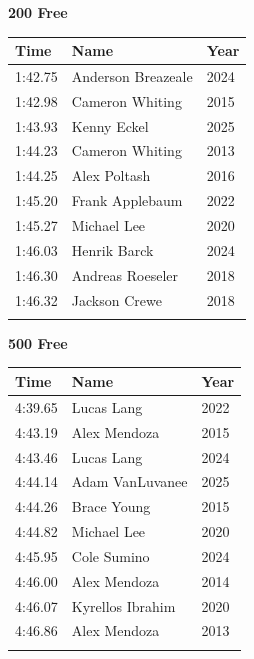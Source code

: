 \vspace{0.5em}
\noindent\begin{minipage}[t]{0.48\textwidth}
\centering
\textbf{\textcolor{teamprimary}{200 Free}}\par
\vspace{0.5em}
\centering
\small
\renewcommand{\arraystretch}{1.0}
\setlength{\tabcolsep}{4pt}
\begin{tabular}{@{}p{1.8cm}p{3.0cm}p{1.0cm}@{}}
\toprule
\textbf{Time} & \textbf{Name} & \textbf{Year} \\
\midrule
1:42.75 & Anderson Breazeale & 2024 \\
1:42.98 & Cameron Whiting & 2015 \\
1:43.93 & Kenny Eckel & 2025 \\
1:44.23 & Cameron Whiting & 2013 \\
1:44.25 & Alex Poltash & 2016 \\
1:45.20 & Frank Applebaum & 2022 \\
1:45.27 & Michael Lee & 2020 \\
1:46.03 & Henrik Barck & 2024 \\
1:46.30 & Andreas Roeseler & 2018 \\
1:46.32 & Jackson Crewe & 2018 \\
\bottomrule
\vspace{0.5em}
\end{tabular}
\end{minipage}
\hfill
\begin{minipage}[t]{0.48\textwidth}
\centering
\textbf{\textcolor{teamprimary}{500 Free}}\par
\vspace{0.5em}
\centering
\small
\renewcommand{\arraystretch}{1.0}
\setlength{\tabcolsep}{4pt}
\begin{tabular}{@{}p{1.8cm}p{3.0cm}p{1.0cm}@{}}
\toprule
\textbf{Time} & \textbf{Name} & \textbf{Year} \\
\midrule
4:39.65 & Lucas Lang & 2022 \\
4:43.19 & Alex Mendoza & 2015 \\
4:43.46 & Lucas Lang & 2024 \\
4:44.14 & Adam VanLuvanee & 2025 \\
4:44.26 & Brace Young & 2015 \\
4:44.82 & Michael Lee & 2020 \\
4:45.95 & Cole Sumino & 2024 \\
4:46.00 & Alex Mendoza & 2014 \\
4:46.07 & Kyrellos Ibrahim & 2020 \\
4:46.86 & Alex Mendoza & 2013 \\
\bottomrule
\vspace{0.5em}
\end{tabular}
\end{minipage}
